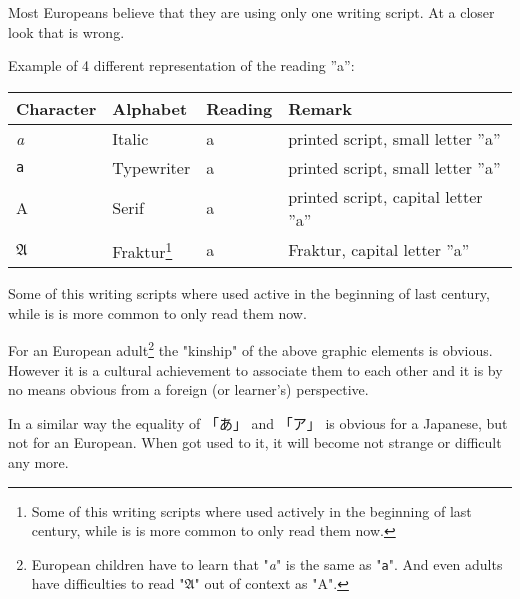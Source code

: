 Most Europeans believe that they are using only one writing script. At a closer
look that is wrong.

\bigskip Example of 4 different representation of the reading ''a'':

\begin{center}
\begin{tabular}{|l|l|l|l|}
\textbf{Character}&\textbf{Alphabet}&\textbf{Reading}&\textbf{Remark}\\\hline
\textit{a}     &  Italic        & a & printed script, small letter ''a'' \\
\texttt{a}     &  Typewriter    & a & printed script, small letter ''a'' \\
A              &  Serif         & a & printed script, capital letter ''a'' \\
$\mathfrak{A}$ & Fraktur\footnote{Some of this writing scripts where used
actively in the beginning of last century, while is is more common to only
read them now.}& a & Fraktur, capital letter ''a''  \\
\end{tabular}
\end{center}

Some of this writing scripts where used active in the beginning of last
century, while is is more common to only read them now.

For an European adult\footnote{European children have to learn that
"\textit{a}" is the same as "\texttt{a}". And even adults have difficulties to
read "$\mathfrak{A}$" out of context as "A".}  the "kinship" of the above
graphic elements is obvious. However it is a cultural achievement to associate
them to each other and it is by no means obvious from a foreign (or learner's)
perspective.

In a similar way the equality of {「あ」} and {「ア」} is obvious for a
Japanese, but not for an European. When got used to it, it will become not
strange or difficult any more.

